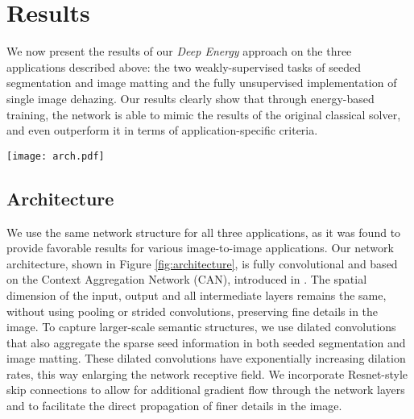 \documentclass[journal]{IEEEtran}
\begin{document}
\section{Results} \label{s:results}

We now present the results of our \emph{Deep Energy} approach on the three applications described above: the two weakly-supervised tasks of seeded segmentation and image matting and the fully unsupervised implementation of single image dehazing. Our results clearly show that through energy-based training, the network is able to mimic the results of the original classical solver, and even outperform it in terms of application-specific criteria. 

\begin{figure*}[t!]
\centering
\texttt{[image: arch.pdf]}
\caption{System architecture. At input, the network receives either regular images or images concatenated with seeds, and outputs a prediction. Our network is a series of ``Dilated Residual Blocks'' in which the spatial dimensions remain intact, but the receptive field increases due to dilated convolutions with increasing dilation factor. Additional Resnet-style skip-connections between the input and output of each block are added for improved gradient flow.
The \emph{Deep Energy} loss receives only the input and prediction of the network, without relying on fully-annotated ground-truth labels.}
\label{fig:architecture}
\end{figure*}



\subsection{Architecture} \label{ss:architecture}

We use the same network structure for all three applications, as it was found to provide favorable results for various image-to-image applications. Our network architecture, shown in Figure \ref{fig:architecture}, is fully convolutional and based on the Context Aggregation Network (CAN), introduced in \cite{CAN}. The spatial dimension of the input, output and all intermediate layers remains the same, without using pooling or strided convolutions, preserving fine details in the image. To capture larger-scale semantic structures, we use dilated convolutions that also aggregate the sparse seed information in both seeded segmentation and image matting. These dilated convolutions have exponentially increasing dilation rates, this way enlarging the network receptive field.
We incorporate Resnet-style \cite{Resnet} skip connections to allow for additional gradient flow through the network layers and to facilitate the direct propagation of finer details in the image.
\end{document}
